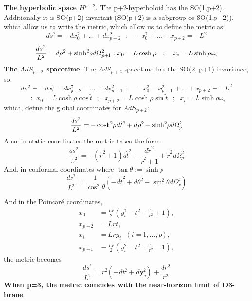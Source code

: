 \documentclass[12pt]{article}
\begin{document}
\textbf{The hyperbolic space} \( H^{p+2} \). The p+2-hyperboloid has the SO(1,p+2). Additionally it is SO(p+2) invariant (SO(p+2) is a subgroup os SO(1,p+2)), which allow us to write the metric, which allow us to define the metric as:
\begin{equation}
    ds^2 = - dx_0^2 + ... + dx_{p+2}^2 ~~~:~~~ -x_0^2 + ... + x_{p+2} = -L^2
\end{equation}
\begin{equation}
    \frac{ds^2}{L^2} = d\rho^2 + \sinh^2{ \hspace{-2pt} \rho } d\Omega_{p+1}^2 : x_0 = L\cosh{ \rho } ~~~;~~~ x_i = L\sinh{ \rho } \omega_i
\end{equation}
\textbf{The \( AdS_{p+2} \) spacetime}. The \( AdS_{p+2} \) spacetime has the SO(2, p+1) invariance, so:
\begin{equation}
    ds^2 = - dx_0^2 - dx_{p+2}^2 + ... + dx_{p+1}^2 ~~~:~~~ - x_0^2 - x_{p+1}^2 + ... + x_{p+2} = -L^2
\end{equation}
\begin{equation}
    ~~:~~ x_0 = L\cosh{ \rho }\cos{ \tilde{t} } ~~~;~~~ x_{p+2} = L\cosh{ \rho }\sin{ \tilde{t} } ~~~;~~~ x_i = L\sinh{ \rho } \omega_i
\end{equation}
which, define the global coordinates for \( AdS_{p+2} \):
\begin{equation}
    \frac{ds^2}{L^2} = -\cosh^2{ \hspace{-2pt}\rho} d\tilde{t}^2 + d\rho^2 + \sinh^2{ \hspace{-2pt} \rho } d\Omega_{p}^2
\end{equation}
Also, in static coordinates the metric takes the form:
\begin{equation}
    \frac{ds^2}{L^2} = -(\tilde{r}^2 + 1) d\tilde{t}^2 + \frac{d\tilde{r}^2}{\tilde{r}^2+1} + \tilde{r}^2 d\Omega_{p}^2
\end{equation}
And, in conformal coordinates where \( \tan\theta := \sinh\rho \)
\begin{equation}
    \frac{ds^2}{L^2} = \frac{1}{\cos^2{ \theta }}\left( -d\tilde{t}^2 + d\theta^2 + \sin^2\theta d\Omega_p^2 \right)
\end{equation}

And in the Poincaré coordinates,
\begin{equation}
    \begin{aligned}
        x_0 &= \frac{Lr}{2}\left( y_i^2 - t^2 + \frac{1}{r^2} + 1 \right), \\
        x_{p+2} &= Lrt, \\
        x_i &= Lry_i ~~~ (i = 1,...,p), \\
        x_{p+1} &= \frac{Lr}{2}\left( y_i^2 - t^2 + \frac{1}{r^2} - 1 \right),
    \end{aligned}
\end{equation}
the metric becomes
\begin{equation}
    \frac{ds^2}{L^2} = r^2\left( -dt^2 + d\mathbf{y}_p^2 \right) + \frac{dr^2}{r^2}
\end{equation}
\textbf{When p=3, the metric coincides with the near-horizon limit of D3-brane}.
\end{document}
